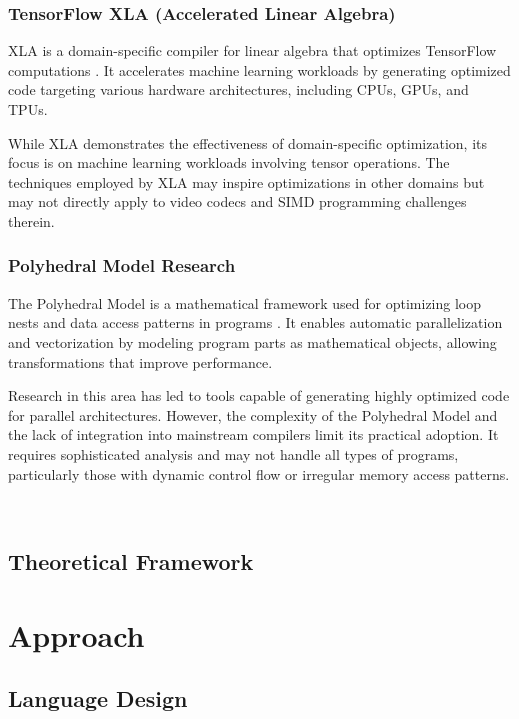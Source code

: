 \documentclass[12pt,a4paper]{article}
\begin{document}
\subsubsection{TensorFlow XLA (Accelerated Linear Algebra)}

XLA is a domain-specific compiler for linear algebra that optimizes TensorFlow computations \citep{XLA2023TensorFlow}. It accelerates machine learning workloads by generating optimized code targeting various hardware architectures, including CPUs, GPUs, and TPUs.

While XLA demonstrates the effectiveness of domain-specific optimization, its focus is on machine learning workloads involving tensor operations. The techniques employed by XLA may inspire optimizations in other domains but may not directly apply to video codecs and SIMD programming challenges therein.

\subsubsection{Polyhedral Model Research}

The Polyhedral Model is a mathematical framework used for optimizing loop nests and data access patterns in programs \citep{Bondhugula2008Polyhedral}. It enables automatic parallelization and vectorization by modeling program parts as mathematical objects, allowing transformations that improve performance.

Research in this area has led to tools capable of generating highly optimized code for parallel architectures. However, the complexity of the Polyhedral Model and the lack of integration into mainstream compilers limit its practical adoption. It requires sophisticated analysis and may not handle all types of programs, particularly those with dynamic control flow or irregular memory access patterns.


\
\subsection{Theoretical Framework}

\section{Approach}
\subsection{Language Design}
\end{document}
